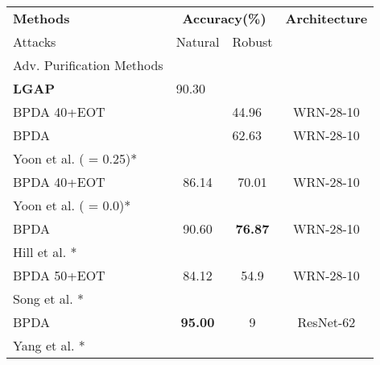 \begin{table}[th]
\small
\centering
\begin{tabular}{lccc}
\hline
\textbf{Methods}                           & \multicolumn{2}{c}{\textbf{Accuracy(\%)}}                         & \textbf{Architecture} \\ 
\qquad Attacks                          & \multicolumn{1}{l}{Natural} & \multicolumn{1}{l}{Robust} & \multicolumn{1}{l}{}  \\ \hline
Adv. Purification Methods & \multicolumn{1}{l}{}        & \multicolumn{1}{l}{}       & \multicolumn{1}{l}{}  \\
\textbf{LGAP}                             & \multicolumn{1}{l}{90.30}   & \multicolumn{1}{l}{}       & \multicolumn{1}{l}{}  \\
\qquad BPDA 40+EOT                      & \multicolumn{1}{l}{}        & \multicolumn{1}{l}{44.96}  & WRN-28-10           \\
\qquad BPDA                             & \multicolumn{1}{l}{}        & \multicolumn{1}{l}{62.63}  & WRN-28-10             \\
Yoon et al. \cite{yoon2021adversarial} ( = 0.25)*                   &                             &                            &                       \\
\qquad BPDA 40+EOT                      & 86.14                       & 70.01                      & WRN-28-10             \\
Yoon et al. \cite{yoon2021adversarial} ( = 0.0)*                    &                             &                            &                       \\
\qquad BPDA                             & 90.60                        & \textbf{76.87}                      & WRN-28-10             \\
Hill et al. \cite{hill2020stochastic}*              &                             &                            &                       \\
\qquad BPDA 50+EOT                      & 84.12                       & 54.9                       & WRN-28-10             \\
Song et al. \cite{song2018pixeldefend}*             &                             &                            &                       \\
\qquad BPDA                             & \textbf{95.00}                          & 9                          & ResNet-62             \\
Yang et al. \cite{yang2019me}*             &                             &                            &                       \\

\end{tabular}
\end{table}
